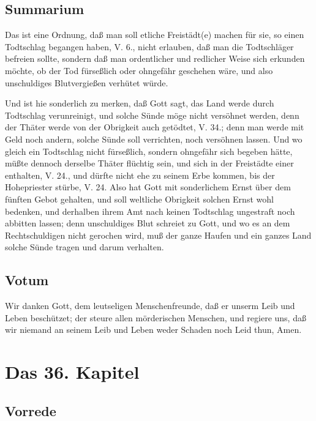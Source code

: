 \section{Summarium}

Das ist eine Ordnung, daß man soll etliche Freistädt(e) machen für sie, so einen Todtschlag begangen haben, V. 6., nicht erlauben, daß man die Todtschläger befreien sollte, sondern daß man ordentlicher und redlicher Weise sich erkunden möchte, ob der Tod fürseßlich oder ohngefähr geschehen wäre, und also unschuldiges Blutvergießen verhütet würde.

Und ist hie sonderlich zu merken, daß Gott sagt, das Land werde durch Todtschlag verunreinigt, und solche Sünde möge nicht versöhnet werden, denn der Thäter werde von der Obrigkeit auch getödtet, V. 34.; denn man werde mit Geld noch andern, solche Sünde soll verrichten, noch versöhnen lassen. Und wo gleich ein Todtschlag nicht fürseßlich, sondern ohngefähr sich begeben hätte, müßte dennoch derselbe Thäter flüchtig sein, und sich in der Freistädte einer enthalten, V. 24., und dürfte nicht ehe zu seinem Erbe kommen, bis der Hohepriester stürbe, V. 24. Also hat Gott mit sonderlichem Ernst über dem fünften Gebot gehalten, und soll weltliche Obrigkeit solchen Ernst wohl bedenken, und derhalben ihrem Amt nach keinen Todtschlag ungestraft noch abbitten lassen; denn unschuldiges Blut schreiet zu Gott, und wo es an dem Rechtschuldigen nicht gerochen wird, muß der ganze Haufen und ein ganzes Land solche Sünde tragen und darum verhalten.

\section{Votum}

Wir danken Gott, dem leutseligen Menschenfreunde, daß er unserm Leib und Leben beschützet; der steure allen mörderischen Menschen, und regiere uns, daß wir niemand an seinem Leib und Leben weder Schaden noch Leid thun, Amen.

\chapter{Das 36. Kapitel}

\section{Vorrede}

